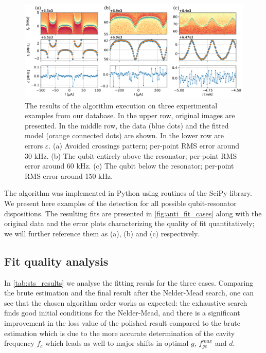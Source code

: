 \documentclass[%
 aip,
 draft,
 amsmath,amssymb,
 reprint,%
]{revtex4-1}
\begin{document}
\begin{figure}
	\centering
	\includegraphics[width=\linewidth]{fit_cases}
	\caption{The results of the algorithm execution on three experimental examples from our database. In the upper row, original images are presented. In the middle row, the data  (blue dots) and the fitted model (orange connected dots) are shown. In the lower row are errors $\varepsilon$. (a) Avoided crossings pattern; per-point RMS error around 30 kHz. (b) The qubit entirely above the resonator; per-point RMS error around 60 kHz. (c) The qubit below the resonator; per-point RMS error around 150 kHz.}
	\label{fig:anti_fit_cases}
\end{figure}

The algorithm was implemented in Python using  routines of the SciPy\cite{scipy} library. We present here examples of the detection for all possible qubit-resonator dispositions.  The resulting fits are presented in \autoref{fig:anti_fit_cases} along with the original data and the error plots characterizing the quality of fit quantitatively; we will further reference them as (a), (b) and (c) respectively.

\subsection{Fit quality analysis} 

In \autoref{tab:sts_results} we analyse the fitting resuls for the three cases. Comparing the brute estimation and the final result after the Nelder-Mead search, one can see that the chosen algorithm order works as expected: the exhaustive search finds good initial conditions for the Nelder-Mead, and there is a significant improvement in the loss value of the polished result compared to the brute estimation which is due to the more accurate determination of the cavity frequency $f_c$ which leads as well to major shifts in optimal $g$, $f_{ge}^{max}$ and $d$.
\end{document}
